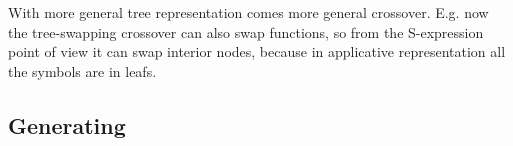 \documentclass{ws-ijait}
\begin{document}
With more general tree representation comes more general crossover. E.g. now the tree-swapping crossover can also swap functions, so from the S-expression point of view it can swap interior nodes, because in applicative representation all the symbols are in leafs.  

\subsection{Generating}

\newcommand{\sigmaPr}{\sigma^\prime}
\newcommand{\tauPr}{\tau^\prime}
\newcommand{\xPr}{x^\prime}
\newcommand{\nPr}{n^\prime}
\newcommand{\nPrr}{n^{\prime\prime}}
\newcommand{\nPrrr}{n^{\prime\prime\prime}}
\newcommand{\tausPr}{\tau_s^\prime}
\newcommand{\s}{\sigma}
\newcommand{\Th}{\theta}
\newcommand{\sPr}{\sigmaPr}
\newcommand{\thPr}{\theta^\prime}



\newcommand{\then}{\Rightarrow}
\newcommand{\E}[2]{(\exists #1)\ #2}
\newcommand{\A}[2]{(\forall #1)\ #2}
\newcommand{\Ain}[3]{(\forall #1 \in #2)\ #3}


\newcommand{\ap}[2]{(#1\,#2)}
\newcommand{\defi}{\coloneqq}
\newcommand{\defe}{\mathrel{\vcentcolon\equiv}}


\newcommand{\inhab}[1]{\op{I}(#1)}

\newcommand{\tord}{\preccurlyeq}
\newcommand{\stord}{\prec}
\newcommand{\ordt}{\tord_\tau}
\newcommand{\tek}{\sim}
\newcommand{\ntek}{\nsim}
\newcommand{\ekt}{\tek_\tau}
\newcommand{\nekt}{\ntek_\tau}
\newcommand{\nsucct}{\nsucc_\tau}

\newcommand{\MGI}[1]{\op{MGI}(#1)}
\newcommand{\MGIt}{\MGI{\tau}}
\newcommand{\It}{\op{I}(\tau)}

\newcommand{\ids}{\sigma_{\op{id}}}

\newcommand{\U}[2]{\op{U}(#1,#2)}
\newcommand{\Utt}{\U{\tau}{\tauPr}}
\newcommand{\MGUtt}{\MGU{\tau}{\tauPr}}

\newcommand{\e}[2]{\op{E}(#1,#2)}
\newcommand{\restrict}[2]{{#1}_{\mid #2}}
\newcommand{\fresh}[2]{\op{fresh}_{#1}(#2)}
\newcommand{\newVar}[1]{\op{newVar}(#1)}
\newcommand{\Ss}[1]{\op{ss}(#1)}
\newcommand{\TS}[2]{\op{ts}_{#1}(#2)}
\newcommand{\ts}[2]{\op{ts}_{#1}(#2)}
\newcommand{\TSij}[3]{\op{ts}_{#1,#2}(#3)}
\newcommand{\trees}[2]{\op{trees}_{#1}(#2)}
\newcommand{\FX}{\ap{F}{X}}
\newcommand{\sF}{\s_{F}}
\newcommand{\sX}{\s_{X}}
\newcommand{\vars}[1]{\op{vars}(#1)}
\newcommand{\dom}[1]{\op{dom}(#1)}
\newcommand{\IH}{induction hypothesis\xspace}
\newcommand{\discup}{~\mathbin{\dot{\cup}}~}
\end{document}

